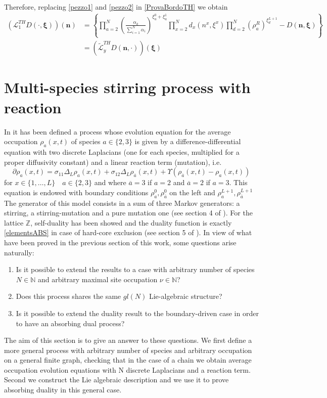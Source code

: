\documentclass[11pt]{article}
\numberwithin{equation}{section}
\numberwithin{equation}{subsection}
\begin{document}
Therefore, replacing \eqref{pezzo1} and \eqref{pezzo2} in \eqref{ProvaBordoTH} we obtain 
\begin{align}
	\left(\mathcal{L}_{1}^{TH}D(\cdot,\bm{\xi})\right)(\bm{n})&=\left\{\prod_{a=2}^{N}\left(\frac{\alpha_{k}}{\sum_{i=1}^{N}\alpha_{i}}\right)^{\xi_{a}^{0}+\xi_{a}^{1}}\prod_{x=2}^{N}d_{x}(n^{x},\xi^{x})\prod_{d=2}^{N}(\rho_{a}^{R})^{\xi_{d}^{L+1}}-D(\bm{n},\bm{\xi})\right\}
	\\&=
	\left(\widetilde{\mathcal{L}}_{y}^{TH}D(\bm{n},\cdot)\right)(\bm{\xi})
\end{align}
\section{Multi-species stirring process with reaction}
In \cite{casini2022uphill} it has been defined a process whose evolution equation for the average occupation $\rho_{a}(x,t)$ of species $a\in \{2,3\}$ is given by a difference-differential equation with two discrete Laplacians (one for each species, multiplied for a proper diffusivity constant) and a linear reaction term (mutation), i.e.
\begin{equation}\label{2SpeciesRD}
	\partial \rho_{a}(x,t)=\sigma_{11}\Delta_{L}\rho_{a}(x,t)+\sigma_{12}\Delta_{L}\rho_{\overline{a}}(x,t)+\Upsilon\left(\rho_{\overline{a}}(x,t)-\rho_{a}(x,t)\right)
\end{equation} 
for $ x\in\{1,\ldots,L\}\quad a\in\{2,3\}$  and where $\overline{a}=3$ if $a=2$ and $\overline{a}=2$ if $a=3$.
This equation is endowed with boundary conditions $\rho_{a}^{0},\rho_{\overline{a}}^{0}$ on the left and $\rho_{a}^{L+1},\rho_{\overline{a}}^{L+1}$ \\The generator of this model consists in a sum of three Markov generators: a stirring, a stirring-mutation and a pure mutation one (see section 4 of \cite{casini2022uphill}). For the lattice $\mathbb{Z}$, self-duality has been showed and the duality function is exactly \eqref{elementsABS} in case of hard-core exclusion (see section 5 of \cite{casini2022uphill}). In view of what have been proved in the previous section of this work, some questions arise naturally:
\begin{enumerate}
		\item Is it possible to extend the results to a case with arbitrary number of species $N\in \mathbb{N}$ and arbitrary maximal site occupation $\nu\in \mathbb{N}$?
			\item Does this process shares the same $gl(N)$ Lie-algebraic structure?
	\item Is it possible to extend the duality result to the boundary-driven case in order to have an absorbing dual process?
\end{enumerate}
The aim of this section is to give an answer to these questions. We first define a more general process with arbitrary number of species and arbitrary occupation on a general finite graph, checking that in the case of a chain we obtain average occupation evolution equations with N discrete Laplacians and a reaction term. Second we construct the Lie algebraic description and we use it to prove absorbing duality in this general case. 
\end{document}
